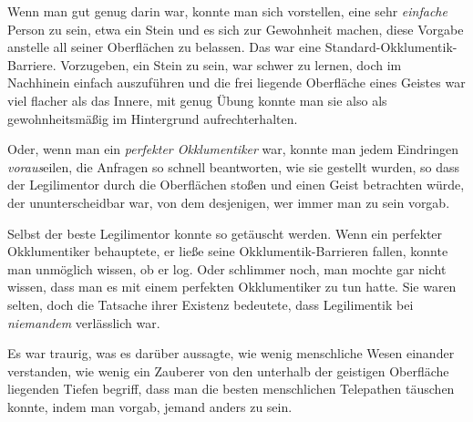 Wenn man gut genug darin war, konnte man sich vorstellen, eine sehr \emph{einfache} Person zu sein, etwa ein Stein und es sich zur Gewohnheit machen, diese Vorgabe anstelle all seiner Oberflächen zu belassen. Das war eine Standard-Okklumentik-Barriere. Vorzugeben, ein Stein zu sein, war schwer zu lernen, doch im Nachhinein einfach auszuführen und die frei liegende Oberfläche eines Geistes war viel flacher als das Innere, mit genug Übung konnte man sie also als gewohnheitsmäßig im Hintergrund aufrechterhalten.

Oder, wenn man ein \emph{perfekter Okklumentiker} war, konnte man jedem Eindringen \emph{voraus}eilen, die Anfragen so schnell beantworten, wie sie gestellt wurden, so dass der Legilimentor durch die Oberflächen stoßen und einen Geist betrachten würde, der ununterscheidbar war, von dem desjenigen, wer immer man zu sein vorgab.

Selbst der beste Legilimentor konnte so getäuscht werden. Wenn ein perfekter Okklumentiker behauptete, er ließe seine Okklumentik-Barrieren fallen, konnte man unmöglich wissen, ob er log. Oder schlimmer noch, man mochte gar nicht wissen, dass man es mit einem perfekten Okklumentiker zu tun hatte. Sie waren selten, doch die Tatsache ihrer Existenz bedeutete, dass Legilimentik bei \emph{niemandem} verlässlich war.

Es war traurig, was es darüber aussagte, wie wenig menschliche Wesen einander verstanden, wie wenig ein Zauberer von den unterhalb der geistigen Oberfläche liegenden Tiefen begriff, dass man die besten menschlichen Telepathen täuschen konnte, indem man vorgab, jemand anders zu sein.

